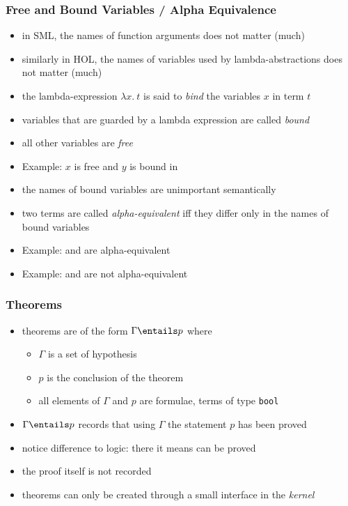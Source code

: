 \begin{frame}
\frametitle{Free and Bound Variables / Alpha Equivalence}
\begin{itemize}
\item in SML, the names of function arguments does not matter (much)
\item similarly in HOL, the names of variables used by lambda-abstractions does not matter (much)
\item the lambda-expression $\lambda x.\ t$ is said to \emph{bind} the variables $x$ in term $t$
\item variables that are guarded by a lambda expression are called \emph{bound}
\item all other variables are \emph{free} 
\item Example: $x$ is free and $y$ is bound in  
\item the names of bound variables are unimportant semantically
\item two terms are called \emph{alpha-equivalent} iff they differ only in the names of bound variables
\item Example:  and  are alpha-equivalent
\item Example:  and  are not alpha-equivalent 
\end{itemize}
\end{frame}


\begin{frame}
\frametitle{Theorems}
\begin{itemize}
\item theorems are of the form $\Gamma \entails p$ where
\begin{itemize}
\item $\Gamma$ is a set of hypothesis
\item $p$ is the conclusion of the theorem
\item all elements of $\Gamma$ and $p$ are formulae, \ie terms of type \texttt{bool}
\end{itemize}
\item $\Gamma \entails p$ records that using $\Gamma$ the statement $p$ \alert{has been} proved\\
\item notice difference to logic: there it means \alert{can be} proved
\item the proof itself is not recorded
\item theorems can only be created through a small interface in the \emph{kernel}
\end{itemize}
\end{frame}


